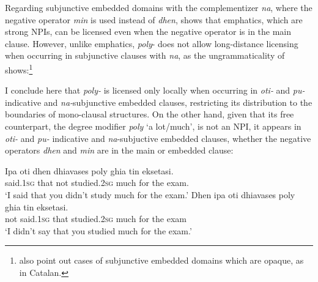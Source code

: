 \documentclass[output=paper]{langscibook}
\begin{document}
\noindent Regarding subjunctive embedded domains with the complementizer \textit{na}, where the negative operator \textit{min} is used instead of \textit{dhen}, \citet{giannaki1997dissert, giannaki1998} shows that emphatics, which are strong NPIs, can be licensed even when the negative operator is in the main clause. However, unlike emphatics, \textit{poly}- does not allow long-distance licensing when occurring in subjunctive clauses with \textit{na}, as the ungrammaticality of  shows:\footnote{\citet{giannakiquer1997} also point out cases of subjunctive embedded domains which are opaque, as in Catalan.}

\begin{exe}
\ex\label{gia:ex20} \begin{xlist}
        \label{gia:ex20b}
    \end{xlist}
\end{exe}

\noindent I conclude here that \textit{poly-} is licensed only locally when occurring in \textit{oti-} and \textit{pu-}indicative and \textit{na-}subjunctive embedded clauses, restricting its distribution to the boundaries of mono-clausal structures. On the other hand, given that its free counterpart, the degree modifier \textit{poly} `a lot/much', is not an NPI, it appears in \textit{oti-}  and \textit{pu-} indicative and \textit{na}-subjuctive embedded clauses, whether the negative operators \textit{dhen} and \textit{min} are in the main or embedded clause:

\begin{exe}
\ex\label{gia:ex21} \begin{xlist}
        \ex\label{gia:ex21a} \gll Ipa oti dhen dhiavases poly ghia tin eksetasi. \\
        said.\textsc{1sg} that not studied.\textsc{2sg} much for the exam. \\
        \trans `I said that you didn't study much for the exam.'
        \ex\label{gia:ex21b} \gll Dhen ipa oti dhiavases poly ghia tin eksetasi. \\
        not said.\textsc{1sg} that studied.\textsc{2sg} much for the exam \\
        \trans `I didn't say that you studied much for the exam.'
    \end{xlist}
\end{exe}
\end{document}
